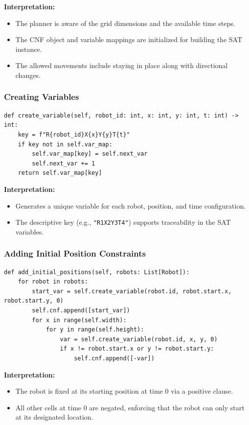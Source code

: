 \documentclass[8pt]{article}
\begin{document}
\textbf{Interpretation:}
\begin{itemize}
    \item The planner is aware of the grid dimensions and the available time steps.
    \item The CNF object and variable mappings are initialized for building the SAT instance.
    \item The allowed movements include staying in place along with directional changes.
\end{itemize}

\subsubsection*{Creating Variables}
\begin{lstlisting}
def create_variable(self, robot_id: int, x: int, y: int, t: int) -> int:
    key = f"R{robot_id}X{x}Y{y}T{t}"
    if key not in self.var_map:
        self.var_map[key] = self.next_var
        self.next_var += 1
    return self.var_map[key]
\end{lstlisting}

\textbf{Interpretation:}
\begin{itemize}
    \item Generates a unique variable for each robot, position, and time configuration.
    \item The descriptive key (e.g., \texttt{"R1X2Y3T4"}) supports traceability in the SAT variables.
\end{itemize}

\subsubsection*{Adding Initial Position Constraints}
\begin{lstlisting}
def add_initial_positions(self, robots: List[Robot]):
    for robot in robots:
        start_var = self.create_variable(robot.id, robot.start.x, robot.start.y, 0)
        self.cnf.append([start_var])
        for x in range(self.width):
            for y in range(self.height):
                var = self.create_variable(robot.id, x, y, 0)
                if x != robot.start.x or y != robot.start.y:
                    self.cnf.append([-var])
\end{lstlisting}

\textbf{Interpretation:}
\begin{itemize}
    \item The robot is fixed at its starting position at time $0$ via a positive clause.
    \item All other cells at time $0$ are negated, enforcing that the robot can only start at its designated location.
\end{itemize}
\end{document}
